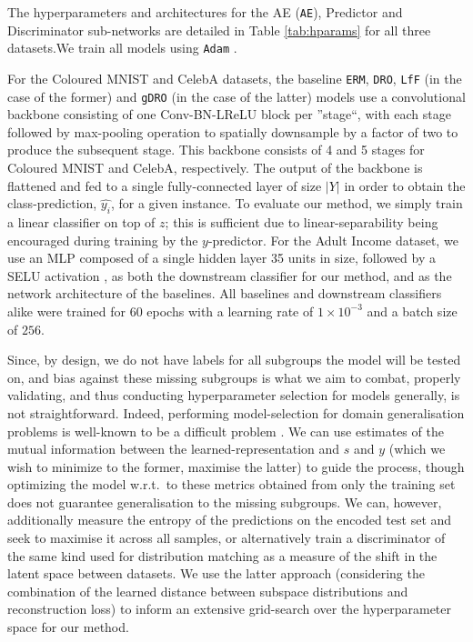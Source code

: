 The hyperparameters and architectures for the \acf{AE} (\texttt{AE}), Predictor and Discriminator
sub-networks are detailed in Table \ref{tab:hparams} for all three datasets.We train all models
using \texttt{Adam} \citep{KinBa15}.

For the Coloured MNIST and CelebA datasets, the baseline \texttt{ERM}, \texttt{DRO}, \texttt{LfF}
(in the case of the former) and \texttt{gDRO} (in the case of the latter) models use a
convolutional backbone consisting of one Conv-BN-LReLU block per ''stage``, with each stage
followed by max-pooling operation to spatially downsample by a factor of two to produce the
subsequent stage. This backbone consists of 4 and 5 stages for Coloured MNIST and CelebA,
respectively. The output of the backbone is flattened and fed to a  single fully-connected layer of
size $|Y|$ in order to obtain the class-prediction, $\hat{y_i}$, for a given instance. To evaluate
our method, we simply train a linear classifier on top of $z$; this is sufficient due to
linear-separability being encouraged during training by the $y$-predictor. For the Adult Income
dataset, we use an \ac{MLP} composed of a single hidden layer 35 units in size, followed by a SELU
activation \citep{klambauer2017self}, as both the downstream classifier for our method, and as the
network architecture of the baselines. All baselines and downstream classifiers alike were trained
for $60$ epochs with a learning rate of $1 \times 10^{-3}$ and a batch size of $256$.

Since, by design, we do not have labels for all subgroups the model will be tested on, and bias
against these missing subgroups is what we aim to combat, properly validating, and thus conducting
hyperparameter selection for models generally, is not straightforward. Indeed, performing
model-selection for domain generalisation problems is well-known to be a difficult problem
\citep{gulrajani2021search}. We can use estimates of the mutual information between the
learned-representation and $s$ and $y$ (which we wish to minimize \wrt{} to the former, maximise
\wrt{} the latter) to guide the process, though optimizing the model w.r.t.\ to these metrics
obtained from only the training set does not guarantee generalisation to the missing subgroups. We
can, however, additionally measure the entropy of the predictions on the encoded test set and seek
to maximise it across all samples, or alternatively train a discriminator of the same kind used for
distribution matching as a measure of the shift in the latent space between datasets. We use the
latter approach (considering the combination of the learned distance between subspace distributions
and reconstruction loss) to inform an extensive grid-search over the hyperparameter space for our
method.

